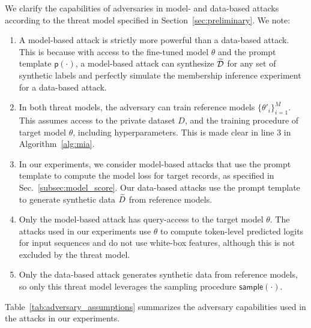 
We clarify the capabilities of adversaries in model- and data-based attacks according to the threat model specified in Section~\ref{sec:preliminary}. We note: 
%
\begin{enumerate}
    \item A model-based attack is strictly more powerful than a data-based attack. This is because with access to the fine-tuned model $\theta$ and the prompt template $\textsf{p}(\cdot)$, a model-based attack can synthesize ${\widetilde{\mathcal{D}}}$ for any set of synthetic labels and perfectly simulate the membership inference experiment for a data-based attack.
    \item In both threat models, the adversary can train reference models $\{ \theta'_i \}_{i=1}^M$. This assumes access to the private dataset $D$, and the training procedure of target model $\theta$, including hyperparameters. This is made clear in line 3 in Algorithm~\ref{alg:mia}.
    \item In our experiments, we consider model-based attacks that use the prompt template \prompt{\cdot} to compute the model loss for target records, as specified in Sec.~\ref{subsec:model_score}. Our data-based attacks use the prompt template \prompt{\cdot} to generate synthetic data ${\widetilde{D}}$ from reference models.
    \item Only the model-based attack has query-access to the target model $\theta$. The attacks used in our experiments use $\theta$ to compute token-level predicted logits for input sequences and do not use white-box features, although this is not excluded by the threat model.
    \item Only the data-based attack generates synthetic data from reference models, so only this threat model leverages the sampling procedure $\textsf{sample}(\cdot)$. 
\end{enumerate} 

Table~\ref{tab:adversary_assumptions} summarizes the adversary capabilities used in the attacks in our experiments.

